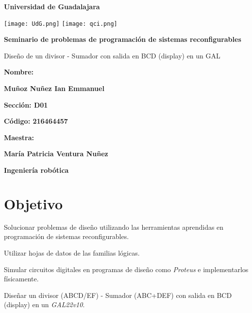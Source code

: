 \documentclass[12pt, oneside, openany]{article}
\begin{document}
    
    \begin{titlepage}
        \centering
        {\bfseries\LARGE Universidad de Guadalajara \par}
        \vfill
        {
            \texttt{[image: UdG.png]}
            \texttt{[image: qci.png]}
            \par
        }
        \vfill
        {\bfseries\LARGE Seminario de problemas de programación de sistemas reconfigurables \par}
        \vfill
        {\LARGE Diseño de un divisor - Sumador con salida en BCD (display) en un GAL \par}
        \vfill
        {\bfseries\LARGE Nombre: \par}
        \vfill
        {\bfseries\LARGE Muñoz Nuñez Ian Emmanuel \par}
        \vfill
        {\bfseries\LARGE Sección: D01 \par}
        \vfill
        {\bfseries\LARGE Código: 216464457 \par}
        \vfill
        {\bfseries\LARGE Maestra: \par}
        \vfill
        {\bfseries\LARGE María Patricia Ventura Nuñez \par}
        \vfill
        {\bfseries\LARGE Ingeniería robótica \par}
    \end{titlepage}
    

\newpage
\section{Objetivo}
{\sffamily\large
    \hspace{0.5cm} Solucionar problemas de diseño utilizando las herramientas aprendidas en programación de sistemas reconfigurables.
    
    \hspace{0.5cm} Utilizar hojas de datos de las familias lógicas.
    
    \hspace{0.5cm} Simular circuitos digitales en programas de diseño como \emph{Proteus\texttrademark} e implementarlos físicamente.
    
    \hspace{0.5cm} Diseñar un divisor (ABCD/EF) - Sumador (ABC+DEF) con salida en BCD (display) en un \emph{GAL22v10}.
}
\end{document}
